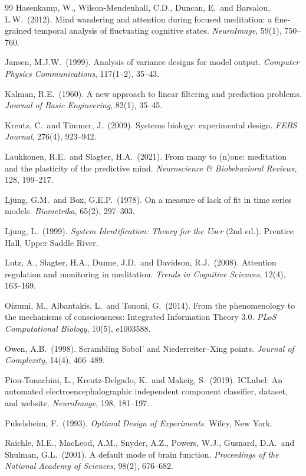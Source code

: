 \documentclass[12pt,a4paper]{article}
\theoremstyle{plain}
\theoremstyle{definition}
\theoremstyle{remark}
\begin{document}
\begin{thebibliography}{99}
Hasenkamp, W., Wilson-Mendenhall, C.D., Duncan, E.\ and Barsalou, L.W.\ (2012).
Mind wandering and attention during focused meditation: a fine-grained temporal analysis of fluctuating cognitive states.
\textit{NeuroImage}, 59(1), 750--760.

Jansen, M.J.W.\ (1999).
Analysis of variance designs for model output.
\textit{Computer Physics Communications}, 117(1--2), 35--43.

Kalman, R.E.\ (1960).
A new approach to linear filtering and prediction problems.
\textit{Journal of Basic Engineering}, 82(1), 35--45.

Kreutz, C.\ and Timmer, J.\ (2009).
Systems biology: experimental design.
\textit{FEBS Journal}, 276(4), 923--942.

Laukkonen, R.E.\ and Slagter, H.A.\ (2021).
From many to (n)one: meditation and the plasticity of the predictive mind.
\textit{Neuroscience \& Biobehavioral Reviews}, 128, 199--217.

Ljung, G.M.\ and Box, G.E.P.\ (1978).
On a measure of lack of fit in time series models.
\textit{Biometrika}, 65(2), 297--303.

Ljung, L.\ (1999).
\textit{System Identification: Theory for the User} (2nd ed.). Prentice Hall, Upper Saddle River.

Lutz, A., Slagter, H.A., Dunne, J.D.\ and Davidson, R.J.\ (2008).
Attention regulation and monitoring in meditation.
\textit{Trends in Cognitive Sciences}, 12(4), 163--169.

Oizumi, M., Albantakis, L.\ and Tononi, G.\ (2014).
From the phenomenology to the mechanisms of consciousness: Integrated Information Theory 3.0.
\textit{PLoS Computational Biology}, 10(5), e1003588.

Owen, A.B.\ (1998).
Scrambling Sobol' and Niederreiter--Xing points.
\textit{Journal of Complexity}, 14(4), 466--489.

Pion-Tonachini, L., Kreutz-Delgado, K.\ and Makeig, S.\ (2019).
ICLabel: An automated electroencephalographic independent component classifier, dataset, and website.
\textit{NeuroImage}, 198, 181--197.

Pukelsheim, F.\ (1993).
\textit{Optimal Design of Experiments}. Wiley, New York.

Raichle, M.E., MacLeod, A.M., Snyder, A.Z., Powers, W.J., Gusnard, D.A.\ and Shulman, G.L.\ (2001).
A default mode of brain function.
\textit{Proceedings of the National Academy of Sciences}, 98(2), 676--682.


\end{thebibliography}
\end{document}
